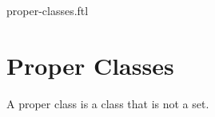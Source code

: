 \documentclass{naproche-library}
\begin{document}
\begin{smodule}{proper-classes.ftl}

  \section*{Proper Classes}

  \begin{definition}[forthel,id=FOUNDATIONS_10_8452102365965847,printid]
    A proper class is a class that is not a set.
  \end{definition}
\end{smodule}
\end{document}
